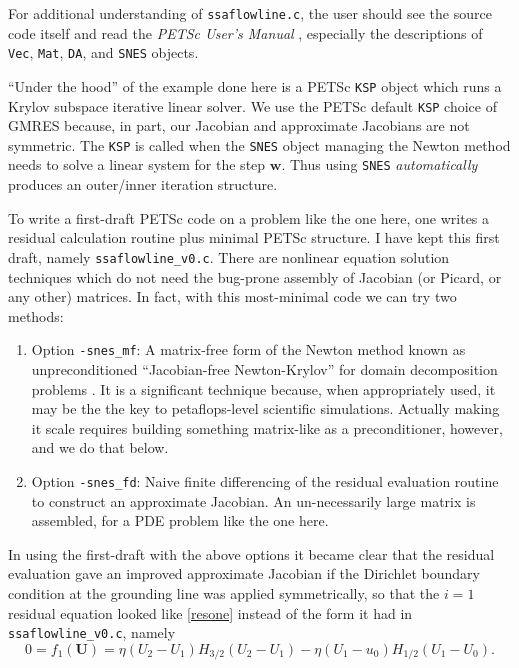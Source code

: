 \documentclass[11pt,final,reqno]{amsart}
\newcommand{\bU}{\mathbf{U}}
\newcommand{\bw}{\mathbf{w}}
\begin{document}
For additional understanding of \texttt{ssaflowline.c}, the user should see the source code itself and read the \emph{PETSc User's Manual} \cite{petsc-user-ref}, especially the descriptions of \texttt{Vec}, \texttt{Mat}, \texttt{DA}, and \texttt{SNES} objects.

``Under the hood'' of the example done here is a PETSc \texttt{KSP} object which runs a Krylov subspace iterative linear solver.  We use the PETSc default \texttt{KSP} choice of GMRES because, in part, our Jacobian and approximate Jacobians are not symmetric.  The \texttt{KSP} is called when the \texttt{SNES} object managing the Newton method needs to solve a linear system for the step $\bw$.  Thus using \texttt{SNES} \emph{automatically} produces an outer/inner iteration structure.

To write a first-draft PETSc code on a problem like the one here, one writes a residual calculation routine plus minimal PETSc structure.  I have kept this first draft, namely \texttt{ssaflowline\_v0.c}.  There are nonlinear equation solution techniques which do not need the bug-prone assembly of Jacobian (or Picard, or any other) matrices.  In fact, with this most-minimal code we can try two methods:\renewcommand{\labelenumi}{\emph{\roman{enumi})}}
\begin{enumerate}
\item Option \texttt{-snes\_mf}:  A matrix-free form of the Newton method known as unpreconditioned ``Jacobian-free Newton-Krylov'' for domain decomposition problems \cite{KnollKeyes2004}.  It is a significant technique because, when appropriately used, it may be the the key to petaflops-level scientific simulations.  Actually making it scale requires building something matrix-like as a preconditioner, however, and we do that below.
\item Option \texttt{-snes\_fd}:  Naive finite differencing of the residual evaluation routine to construct an approximate Jacobian.  An un-necessarily large matrix is assembled, for a PDE problem like the one here.
\end{enumerate}

In using the first-draft with the above options it became clear that the residual evaluation gave an improved approximate Jacobian if the Dirichlet boundary condition at the grounding line was applied symmetrically, so that the $i=1$ residual equation looked like \eqref{resone} instead of the form it had in \texttt{ssaflowline\_v0.c}, namely
	$$0 = f_1(\bU) = \eta(U_2-U_1) H_{3/2} (U_2 - U_1) - \eta(U_1 - u_0) H_{1/2} (U_1 - U_0).$$
\end{document}

